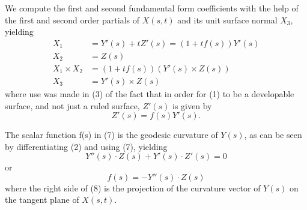 \documentclass{book}
\begin{document}
We compute the first and second fundamental form coefficients with the help of the first and second order partials of $X(s,t)$ and its unit surface normal $X_{3}$, yielding
\begin{align}
X_{1} & = Y'(s) + tZ'(s) = (1 + tf(s))Y'(s) \\
X_{2} & = Z(s) \\
X_{1} \times X_{2} & = (1 + tf(s))(Y'(s) \times Z(s)) \\
X_{3} & = Y'(s) \times Z(s)
\end{align}
where use was made in (3) of the fact that in order for (1) to be a developable surface, and not just a ruled surface, $Z'(s)$ is given by
\begin{equation}
Z'(s) = f(s)Y'(s).
\end{equation}

The scalar function f(s) in (7) is the geodesic curvature of $Y(s)$, as can be seen by differentiating (2) and using (7), yielding
\begin{equation*}
Y''(s) \cdot Z(s) + Y'(s) \cdot Z'(s) = 0
\end{equation*}
or
\begin{equation}
f(s) = - Y''(s) \cdot Z(s)
\end{equation}
where the right side of (8) is the projection of the curvature vector of $Y(s)$ on the tangent plane of $X(s, t)$.
\end{document}
